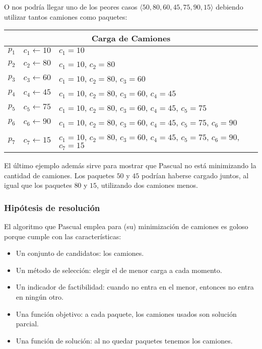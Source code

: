 \documentclass[11pt, a4paper, twoside]{article}
\begin{document}
O nos podría llegar uno de los peores casos $\langle 50, 80, 60, 45, 75, 90, 15 \rangle$
debiendo utilizar tantos camiones como paquetes:
\begin{center}
	\begin{tabular}{ | r | l | l | }
		\hline
		\multicolumn{3}{|c|}{\textbf{Carga de Camiones}} \\
		\hline
		$p_{1}$ & $c_1 \gets 10$ & $c_{1}=10$ \\
		$p_{2}$ & $c_2 \gets 80$ & $c_{1}=10$, $c_{2}=80$ \\
		$p_{3}$ & $c_3 \gets 60$ & $c_{1}=10$, $c_{2}=80$, $c_{3}=60$ \\
		$p_{4}$ & $c_4 \gets 45$ & $c_{1}=10$, $c_{2}=80$, $c_{3}=60$, $c_{4}=45$ \\
		$p_{5}$ & $c_5 \gets 75$ & $c_{1}=10$, $c_{2}=80$, $c_{3}=60$, $c_{4}=45$, $c_{5}=75$ \\
		$p_{6}$ & $c_6 \gets 90$ & $c_{1}=10$, $c_{2}=80$, $c_{3}=60$, $c_{4}=45$, $c_{5}=75$, $c_{6}=90$ \\
		$p_{7}$ & $c_7 \gets 15$ & $c_{1}=10$, $c_{2}=80$, $c_{3}=60$, $c_{4}=45$, $c_{5}=75$, $c_{6}=90$, $c_{7}=15$ \\
		\hline
	\end{tabular}
\end{center}

El último ejemplo además sirve para mostrar que Pascual no está minimizando la cantidad de camiones.
Los paquetes $50$ y $45$ podrían haberse cargado juntos, al igual que los paquetes $80$ y $15$,
utilizando dos camiones menos.

\subsubsection{Hipótesis de resolución}

El algoritmo que Pascual emplea para (su) minimización de camiones es goloso
porque cumple con las características:

\begin{itemize}
	\item Un conjunto de candidatos: los camiones.
	\item Un método de selección: elegir el de menor carga a cada momento.
	\item Un indicador de factibilidad: cuando no entra en el menor, entonces no entra en ningún otro.
	\item Una función objetivo: a cada paquete, los camiones usados son solución parcial.
	\item Una función de solución: al no quedar paquetes tenemos los camiones.
\end{itemize}
\end{document}
